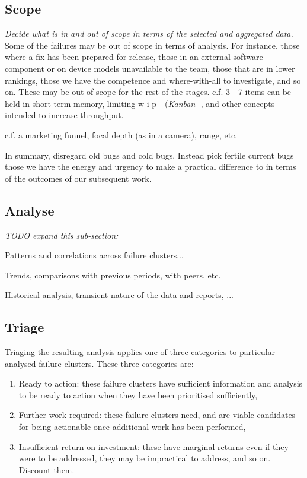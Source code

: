 \subsection{Scope}
\emph{Decide what is in and out of scope in terms of the selected and aggregated data.} Some of the failures may be out of scope in terms of analysis. For instance, those where a fix has been prepared for release, those in an external software component or on device models unavailable to the team, those that are in lower rankings, those we have the competence and where-with-all to investigate, and so on. These may be out-of-scope for the rest of the stages. c.f. 3 - 7 items can be held in short-term memory, limiting w-i-p - (\emph{Kanban} -, and other concepts intended to increase throughput.

c.f. a marketing funnel, focal depth (as in a camera), range, etc. 

In summary, disregard old bugs and cold bugs. Instead pick fertile current bugs those we have the energy and urgency to make a practical difference to in terms of the outcomes of our subsequent work.


\subsection{Analyse}
\textit{TODO expand this sub-section:}

Patterns and correlations across failure clusters... 

Trends, comparisons with previous periods, with peers, etc.

Historical analysis, transient nature of the data and reports, ...

\subsection{Triage}
Triaging the resulting analysis applies one of three categories to particular analysed failure clusters. These three categories are:
\begin{enumerate}
    \item Ready to action: these failure clusters have sufficient information and analysis to be ready to action when they have been prioritised sufficiently,
    \item Further work required: these failure clusters need, and are viable candidates for being actionable once additional work has been performed,
    \item Insufficient return-on-investment: these have marginal returns even if they were to be addressed, they may be impractical to address, and so on. Discount them.
\end{enumerate}

